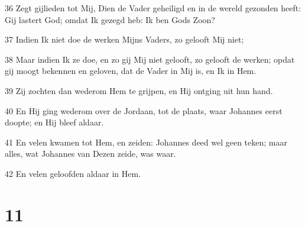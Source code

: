 \par 36 Zegt gijlieden tot Mij, Dien de Vader geheiligd en in de wereld gezonden heeft: Gij lastert God; omdat Ik gezegd heb: Ik ben Gods Zoon?
\par 37 Indien Ik niet doe de werken Mijns Vaders, zo gelooft Mij niet;
\par 38 Maar indien Ik ze doe, en zo gij Mij niet gelooft, zo gelooft de werken; opdat gij moogt bekennen en geloven, dat de Vader in Mij is, en Ik in Hem.
\par 39 Zij zochten dan wederom Hem te grijpen, en Hij ontging uit hun hand.
\par 40 En Hij ging wederom over de Jordaan, tot de plaats, waar Johannes eerst doopte; en Hij bleef aldaar.
\par 41 En velen kwamen tot Hem, en zeiden: Johannes deed wel geen teken; maar alles, wat Johannes van Dezen zeide, was waar.
\par 42 En velen geloofden aldaar in Hem.

\chapter{11}


